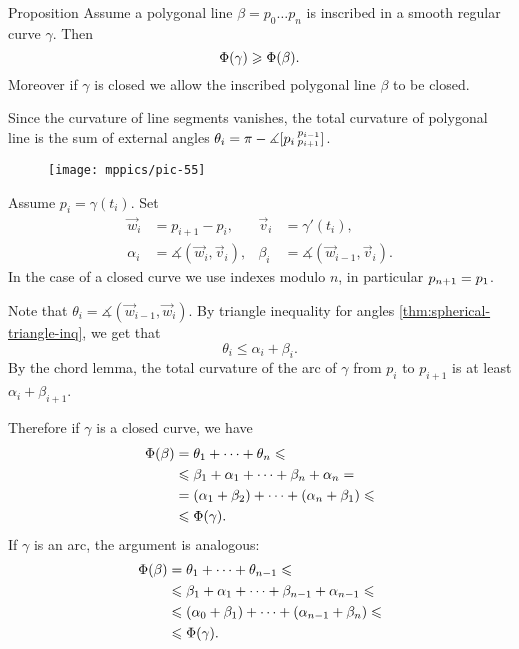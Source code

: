 \begin{thm}{Proposition}\label{prop:inscribed-total-curvature}
Assume a polygonal line $\beta=p_0\dots p_n$ is inscribed in a smooth regular curve $\gamma$.
Then 
\[\Phi({\gamma})\geqslant \Phi({\beta}).\]
Moreover if $\gamma$ is closed we allow the inscribed polygonal line $\beta$ to be closed.

\end{thm}

Since the curvature of line segments vanishes, 
the total curvature of polygonal line is the sum of external angles $\theta_i=\pi-
\measuredangle[p_i\,{}^{p_{i-1}}_{p_{i+1}}]$.

\begin{wrapfigure}{o}{40 mm}
\vskip-0mm
\centering
\texttt{[image: mppics/pic-55]}
\vskip0mm
\end{wrapfigure}

Assume $p_i=\gamma(t_i)$.
Set 
\begin{align*}
\vec w_i&=p_{i+1}-p_i,& \vec v_i&=\gamma'(t_i),
\\
\alpha_i&=\measuredangle(\vec w_i,\vec v_i),&\beta_i&=\measuredangle(\vec w_{i-1},\vec v_i).
\end{align*}
In the case of a closed curve we use indexes modulo $n$, in particular $p_{n+1}\z=p_1$.

Note that $\theta_i=\measuredangle(\vec w_{i-1},\vec w_i)$.
By triangle inequality for angles \ref{thm:spherical-triangle-inq}, we get that
\[\theta_i\le \alpha_i+\beta_i.\]
By the chord lemma, the total curvature of the arc of $\gamma$ from $p_i$ to $p_{i+1}$ is at least $\alpha_i+\beta_{i+1}$. 

Therefore if $\gamma$ is a closed curve, we have
\begin{align*}
\Phi({\beta})&=\theta_1+\dots+\theta_n\leqslant 
\\
&\leqslant\beta_1+\alpha_1+\dots+\beta_n+\alpha_n = 
\\
&=(\alpha_1+\beta_2)+\dots+(\alpha_n+\beta_1) \leqslant 
\\
&\leqslant \Phi({\gamma}).
\end{align*}
If $\gamma$ is an arc, the argument is analogous:
\begin{align*}
\Phi({\beta})&=\theta_1+\dots+\theta_{n-1}\leqslant 
\\
&\leqslant\beta_1+\alpha_1+\dots+\beta_{n-1}+\alpha_{n-1} \leqslant
\\
&\leqslant (\alpha_0+\beta_1)+\dots+(\alpha_{n-1}+\beta_n) \leqslant 
\\
&\leqslant \Phi({\gamma}).
\end{align*}
\qedsf

